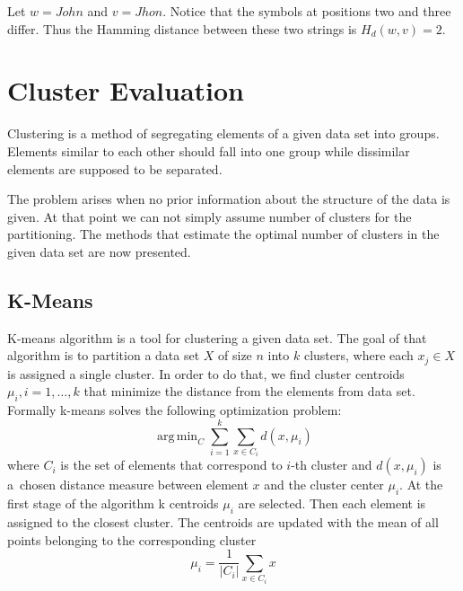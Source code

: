 \documentclass{mini}
\DeclareMathOperator*{\argmin}{arg\,min} %
\begin{document}
Let $w = John$ and $v = Jhon$. Notice that the symbols at positions two and three differ. Thus the Hamming distance between these two strings is $H_d(w,v) = 2$.

\section{Cluster Evaluation} \label{sec::cluster}

Clustering is a method of segregating elements of a given data set into groups. Elements similar to each other should fall into one group while dissimilar elements are supposed to be separated.

The problem arises when no prior information about the structure of the data is given. At that point we can not simply assume number of clusters for the partitioning. The methods that estimate the optimal number of clusters in the given data set are now presented.

\subsection{K-Means}

K-means algorithm is a tool for clustering a given data set.
The goal of that algorithm is to partition a data set $X$ of size $n$ into $k$ clusters, where each $x_{j}\in X$ is assigned a single cluster. In order to do that, we find cluster centroids $\mu_{i}, i=1,\ldots,k$ that minimize the distance from the elements from data set. Formally k-means solves the following optimization problem:
\begin{equation}
    \argmin_{C}\sum_{i=1}^{k}\sum_{x\in C_{i}} d(x,\mu_{i})
\end{equation}
where $C_{i}$ is the set of elements that correspond to $i$-th cluster and $d(x,\mu_{i})$ is a~chosen distance measure between element $x$ and the cluster center $\mu_{i}$. At the first stage of the algorithm k centroids $\mu_{i}$ are selected. Then each element is assigned to the closest cluster. The centroids are updated with the mean of all points belonging to the corresponding cluster
\begin{equation}
    \mu_{i} = \frac{1}{|C_{i}|} \sum_{x\in C_{i}} x
\end{equation}
\end{document}
